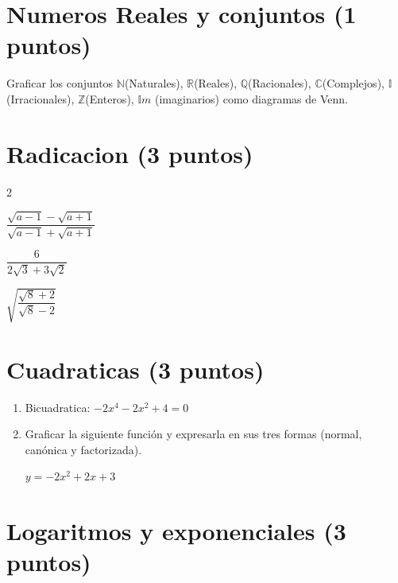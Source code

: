 \documentclass[a4paper,11pt,spanish,sans]{exam}
\begin{document}
\section{Numeros Reales y conjuntos (1 puntos) }
Graficar los conjuntos $\mathbb{N}$(Naturales), $\mathbb{R}$(Reales), $\mathbb{Q}$(Racionales), $\mathbb{C}$(Complejos), $\mathbb{I}$(Irracionales), $\mathbb{Z}$(Enteros), $\mathbb{I}m$ (imaginarios) como diagramas de Venn.

\section{Radicacion (3 puntos)}
	
	\begin{enumerate}
	\end{enumerate}

\section{Cuadraticas (3 puntos)}
	\begin{enumerate}
		\item Bicuadratica: $-2x^4-2x^2+4=0$
		\item Graficar la siguiente función y expresarla en sus tres formas (normal, canónica y factorizada).
		
		$y=-2x^2+2x+3 $
	\end{enumerate}

\section{Logaritmos y exponenciales (3 puntos)}
\end{document}

